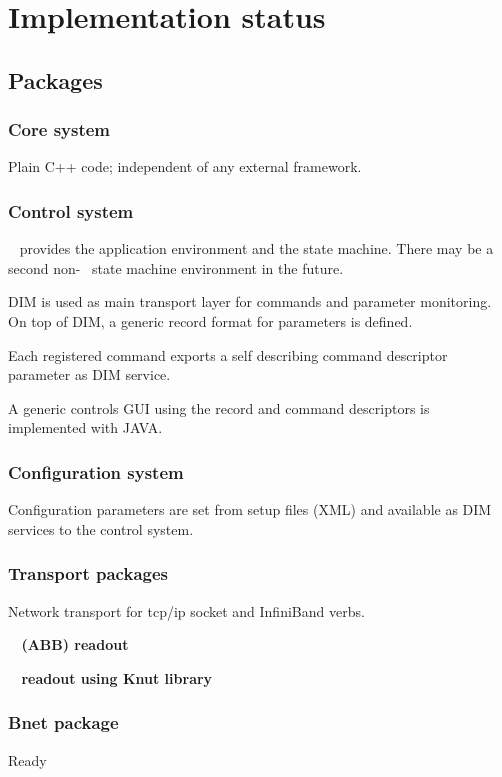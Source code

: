 \section{Implementation status}
\subsection{Packages}
\subsubsection{Core system}
   Plain C++ code; independent of any external framework.
\subsubsection{Control system}
\begin{compactitem}[$\circ$]
\item  \xdaq~ provides the application environment and the state machine. 
      There may be a second non-\xdaq~ state machine environment in the future. 
\item  DIM is used as main transport layer for commands and parameter monitoring. 
      On top of DIM, a generic record format for parameters is defined.
\item  Each registered command exports a self describing command descriptor 
      parameter as DIM service.      
\item  A generic controls GUI using the record and command descriptors is 
      implemented with JAVA.
\end{compactitem}
\subsubsection{Configuration system}
Configuration parameters are set from setup files (XML) and 
available as DIM services to the control system.
\subsubsection{Transport packages}
\begin{compactitem}[$\circ$]
\item  Network transport for  tcp/ip socket and InfiniBand verbs.
\item  {\bf \ABB~ (ABB) readout}
\item  {\bf \ROC~ readout using Knut library}
\end{compactitem}
\subsubsection{Bnet package}
   Ready

